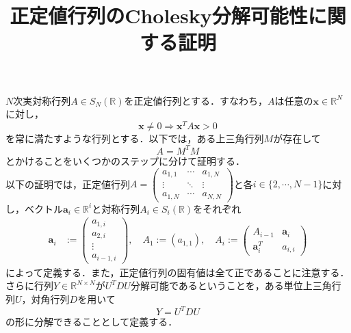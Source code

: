 \documentclass{jsarticle}
\title{正定値行列のCholesky分解可能性に関する証明}
\date{}
\theoremstyle{definition}
\theoremstyle{mystyle} %
\begin{document}
\maketitle
\Large
$N$次実対称行列$A\in S_N(\mathbb{R})$を正定値行列とする．すなわち，$A$は任意の${\bm x}\in \mathbb{R}^N$に対し，
$${\bm x}\neq 0\Rightarrow {\bm x}^T A{\bm x}>0$$
を常に満たすような行列とする．以下では，ある上三角行列$M$が存在して
$$A=M^TM$$
とかけることをいくつかのステップに分けて証明する．\\


以下の証明では，正定値行列$A=\displaystyle\begin{pmatrix}
a_{1,1}&\cdots&a_{1,N}\\
\vdots & \ddots & \vdots \\
a_{1,N} & \cdots & a_{N,N} 
\end{pmatrix}$と各$i\in \{2,\cdots,N-1\}$に対し，ベクトル${\bm a}_i\in \mathbb{R}^i$と対称行列$A_i\in S_i(\mathbb{R})$をそれぞれ
\begin{align*}
{\bm a}_i &:=\left(\begin{array}{c}
a_{1,i}\\
a_{2,i}\\
\vdots\\
a_{i-1,i}
\end{array}\right),\quad A_1 :=(a_{1,1}),\quad A_i:=\begin{pmatrix}
A_{i-1} & {\bm a}_i\\
{\bm a}_i^T & a_{i,i}
\end{pmatrix}
\end{align*}
によって定義する．また，正定値行列の固有値は全て正であることに注意する．\\
さらに行列$Y\in \mathbb{R}^{N\times N}$が$U^TDU$分解可能であるということを，ある単位上三角行列$U$，対角行列$D$を用いて
$$Y=U^TDU$$
の形に分解できることとして定義する．\\
\end{document}
